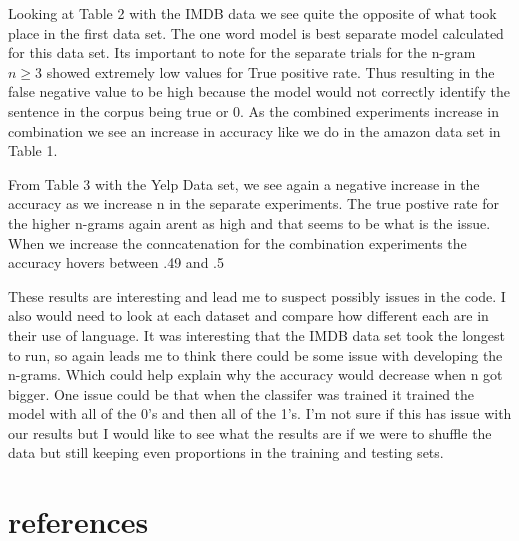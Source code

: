 \documentclass[12pt]{article}
\begin{document}
Looking at Table 2 with the IMDB data we see quite the opposite of what took place in the first data set. The one word model is best separate model calculated for this data set. Its important to note for the separate trials for the n-gram $ n \geq3 $ showed extremely low values for True positive rate. Thus resulting in the false negative value to be high because the model would not correctly identify the sentence in the corpus being true or 0. As the combined experiments increase in combination we see an increase in accuracy like we do in the amazon data set in Table 1. 

From Table 3 with the Yelp Data set, we see again a negative increase in the accuracy as we increase n in the separate experiments. The true postive rate for the higher n-grams again arent as high and that seems to be what is the issue. When we increase the conncatenation for the combination experiments the accuracy hovers between .49 and .5 

These results are interesting and lead me to suspect possibly issues in the code. I also would need to look at each dataset and compare how different each are in their use of language. It was interesting that the IMDB data set took the longest to run, so again leads me to think there could be some issue with developing the n-grams. Which could help explain why the accuracy would decrease when n got bigger. One issue could be that when the classifer was trained it trained the model with all of the 0's and then all of the 1's. I'm not sure if this has issue with our results but I would like to see what the results are if we were to shuffle the data but still keeping even proportions in the training and testing sets. 

\section{references}
 
\end{document}
